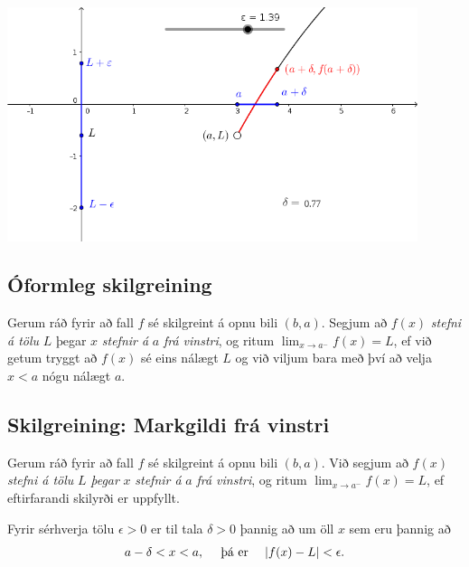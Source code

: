 \documentclass[b5paper,10pt,icelandic]{sphinxmanual}
\begin{document}
\begin{center}
\includegraphics[width=12cm,keepaspectratio=true]{02_markfrahaegri.png}
\end{center}



\subsection{Óformleg skilgreining}
\label{kafli02:id2}\label{kafli02:index-2}
Gerum ráð fyrir að fall \(f\) sé skilgreint á opnu bili
\((b,a)\). Segjum að \(f(x)\) \emph{stefni á tölu} \(L\) þegar
\(x\) \emph{stefnir á} \(a\) \emph{frá vinstri}, og ritum
\(\lim_{x\rightarrow a^-} f(x)=L\), ef við getum tryggt að
\(f(x)\) sé eins nálægt \(L\) og við viljum bara með því að
velja \(x<a\) nógu nálægt \(a\).


\subsection{Skilgreining: Markgildi frá vinstri}
\label{kafli02:skilgreining-markgildi-fra-vinstri}
Gerum ráð fyrir að fall \(f\) sé skilgreint á opnu bili
\((b,a)\). Við segjum að \(f(x)\) \emph{stefni á tölu} \(L\)
\emph{þegar} \(x\) \emph{stefnir á} \(a\) \emph{frá vinstri}, og ritum
\(\lim_{x\rightarrow a^-} f(x)=L\), ef eftirfarandi skilyrði er
uppfyllt.

Fyrir sérhverja tölu \(\epsilon>0\) er til tala \(\delta>0\)
þannig að um öll \(x\) sem eru þannig að
\begin{gather}
\begin{split}a-\delta<x<a,\quad \text{ þá er } \quad |f(x)-L| <\epsilon.\end{split}\notag
\end{gather}
\end{document}
